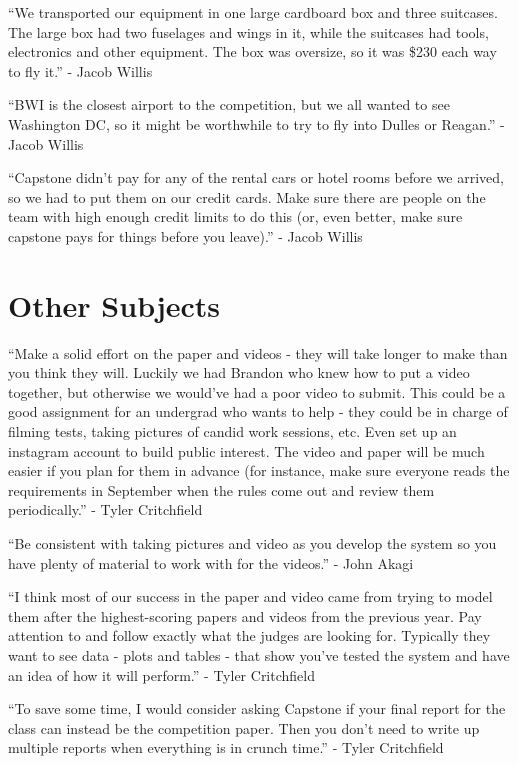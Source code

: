 \documentclass[]{auvsi_doc}
\begin{document}
{}

{``We transported our equipment in one large cardboard box and three
suitcases. The large box had two fuselages and wings in it, while the
suitcases had tools, electronics and other equipment. The box was
oversize, so it was \$230 each way to fly it.'' - Jacob Willis}

{``BWI is the closest airport to the competition, but we all wanted to
see Washington DC, so it might be worthwhile to try to fly into Dulles
or Reagan.'' - Jacob Willis}

{``Capstone didn't pay for any of the rental cars or hotel rooms before
we arrived, so we had to put them on our credit cards. Make sure there
are people on the team with high enough credit limits to do this (or,
even better, make sure capstone pays for things before you leave).'' -
Jacob Willis}

\section{Other Subjects}

{``Make a solid effort on the paper and videos - they will take longer
to make than you think they will. Luckily we had Brandon who knew how to
put a video together, but otherwise we would've had a poor video to
submit. This could be a good assignment for an undergrad who wants to
help - they could be in charge of filming tests, taking pictures of
candid work sessions, etc. Even set up an instagram account to build
public interest. The video and paper will be much easier if you plan for
them in advance (for instance, make sure everyone reads the requirements
in September when the rules come out and review them periodically.'' -
Tyler Critchfield}

{}

{``Be consistent with taking pictures and video as you develop the
system so you have plenty of material to work with for the videos.'' -
John Akagi}

{}

{``I think most of our success in the paper and video came from trying
to model them after the highest-scoring papers and videos from the
previous year. Pay attention to and follow exactly what the judges are
looking for. Typically they want to see data - plots and tables - that
show you've tested the system and have an idea of how it will perform.''
- Tyler Critchfield}

{}

{``To save some time, I would consider asking Capstone if your final
report for the class can instead be the competition paper. Then you
don't need to write up multiple reports when everything is in crunch
time.'' - Tyler Critchfield}
\end{document}
